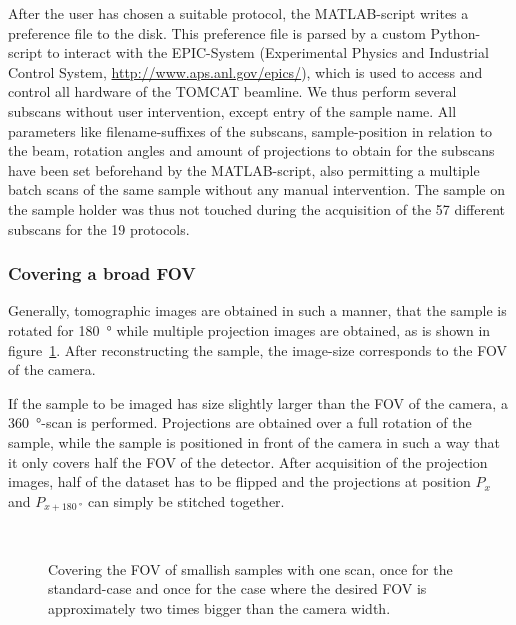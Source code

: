 After the user has chosen a suitable protocol, the MATLAB-script writes a preference file to the disk. This preference file is parsed by a custom Python-script to interact with the EPIC-System (Experimental Physics and Industrial Control System, \url{http://www.aps.anl.gov/epics/}), which is used to access and control all hardware of the TOMCAT beamline. We thus perform several subscans without user intervention, except entry of the sample name. All parameters like filename-suffixes of the subscans, sample-position in relation to the beam, rotation angles and amount of projections to obtain for the subscans have been set beforehand by the MATLAB-script, also permitting a multiple batch scans of the same sample without any manual intervention. The sample on the sample holder was thus not touched during the acquisition of the 57 different subscans for the 19 protocols. 

\subsubsection{Covering a broad FOV}
\label{subsec:covering a broad fov}
Generally, tomographic images are obtained in such a manner, that the sample is rotated for \SI{180}{\degree} while multiple projection images are obtained, as is shown in figure~\ref{fig:covering-one scan}. After reconstructing the sample, the image-size corresponds to the FOV of the camera.

If the sample to be imaged has size slightly larger than the FOV of the camera, a \SI{360}{\degree}-scan is performed. Projections are obtained over a full rotation of the sample, while the sample is positioned in front of the camera in such a way that it only covers half the FOV of the detector. After acquisition of the projection images, half of the dataset has to be flipped and the projections at position $P_{x}$ and $P_{x+\SI{180}{\degree}}$ can simply be stitched together.

\begin{figure}
	\centering
	\\
	\caption{Covering the FOV of smallish samples with one scan, once for the standard-case and once for the case where the desired FOV is approximately two times bigger than the camera width.}
	\label{fig:covering-one scan}
\end{figure}

